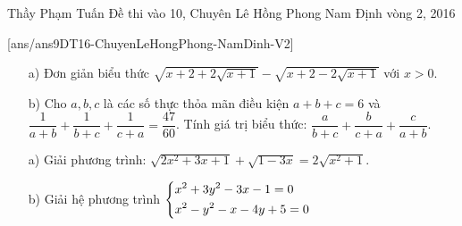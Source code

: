 \begin{name}
{Thầy  Phạm Tuấn}
{Đề thi vào 10, Chuyên Lê Hồng Phong Nam Định vòng 2, 2016}
\end{name}
\setcounter{ex}{0}
[ans/ans9DT16-ChuyenLeHongPhong-NamDinh-V2]
\begin{ex}%
\hfill
\begin{enumerate}
\item[a)] Đơn giản biểu thức $\sqrt{x+2+2\sqrt{x+1}}-\sqrt{x+2-2\sqrt{x+1}}$ với $x>0$.
\item[b)]  Cho $a,b,c$ là các số thực thỏa mãn điều kiện $a+b+c=6$ và $\dfrac{1}{a+b}+\dfrac{1}{b+c}+\dfrac{1}{c+a}=\dfrac{47}{60}$. Tính giá trị biểu thức: $\dfrac{a}{b+c}+\dfrac{b}{c+a}+\dfrac{c}{a+b}$.
\end{enumerate}
\end{ex}

\begin{ex}%
\hfill
\begin{enumerate}
\item[a)] Giải phương trình: $\sqrt{2x^2+3x+1}+\sqrt{1-3x}=2\sqrt{x^2+1}$.
\item[b)] Giải hệ phương trình $\left\{\begin{aligned}&x^2+3y^2-3x-1=0 \\&x^2-y^2-x-4y+5=0\end{aligned}\right.$
\end{enumerate}
\end{ex}

